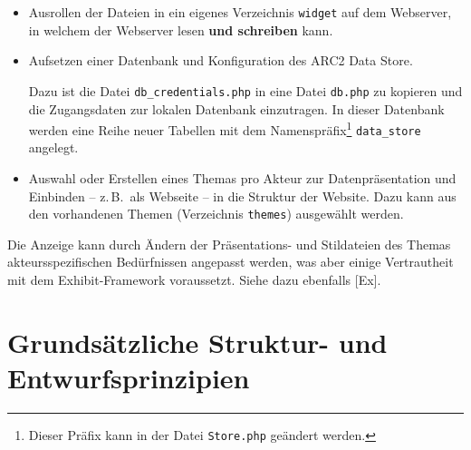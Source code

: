 \documentclass[11pt,a4paper]{article}
\begin{document}
\begin{itemize}
\item Ausrollen der Dateien in ein eigenes Verzeichnis \texttt{widget} auf dem
  Webserver, in welchem der Webserver lesen \textbf{und schreiben} kann.
	\item Aufsetzen einer Datenbank und Konfiguration des ARC2 Data
  Store.

  Dazu ist die Datei \texttt{db\_credentials.php} in eine Datei
  \texttt{db.php} zu kopieren und die Zugangsdaten zur lokalen Datenbank
  einzutragen. In dieser Datenbank werden eine Reihe neuer Tabellen mit dem
  Namenspräfix\footnote{Dieser Präfix kann in der Datei \texttt{Store.php}
    geändert werden.} \texttt{data\_store} angelegt.
\item Auswahl oder Erstellen eines Themas pro Akteur zur Datenpräsentation und
  Einbinden -- z.\,B.\ als Webseite -- in die Struktur der Website.  Dazu kann
  aus den vorhandenen Themen (Verzeichnis \texttt{themes}) ausgewählt werden. 
\end{itemize}
Die Anzeige kann durch Ändern der Präsentations- und Stildateien des Themas
akteurs\-spezifischen Bedürfnissen angepasst werden, was aber einige
Vertrautheit mit dem Exhibit-Framework voraussetzt.  Siehe dazu ebenfalls
[Ex].

\section{Grundsätzliche Struktur- und Entwurfsprinzipien}
\end{document}
